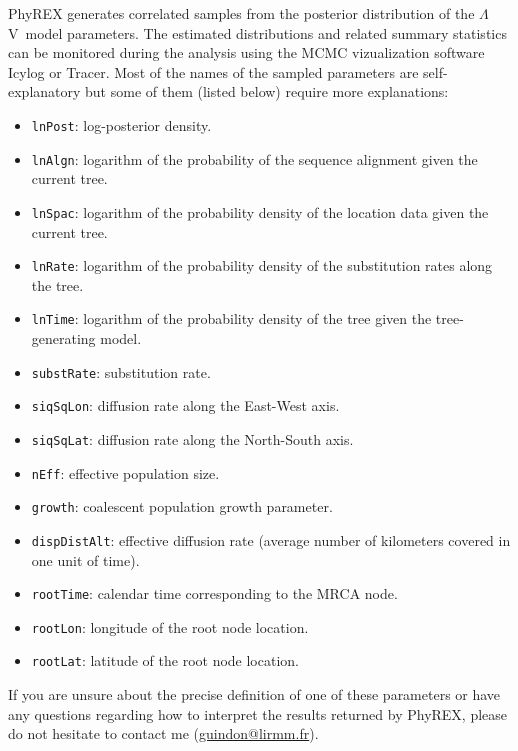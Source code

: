 \documentclass[a4paper,12pt]{article}
\newcommand{\sfv}{$\Lambda$V}
\begin{document}
PhyREX generates correlated samples from the posterior distribution of the \sfv\ model
parameters. The estimated distributions and related summary statistics can be monitored during the
analysis using the MCMC vizualization software Icylog or Tracer. Most of the names of the sampled
parameters are self-explanatory but some of them (listed below) require more explanations:
\begin{itemize}
\item \texttt{lnPost}: log-posterior density.
\item \texttt{lnAlgn}: logarithm of the probability of the sequence alignment given the current tree.
\item \texttt{lnSpac}: logarithm of the probability density of the location data given the current tree. 
\item \texttt{lnRate}: logarithm of the probability density of the substitution rates along the tree. 
\item \texttt{lnTime}: logarithm of the probability density of the tree given the tree-generating model. 
\item \texttt{substRate}: substitution rate.
\item \texttt{siqSqLon}: diffusion rate along the East-West axis.
\item \texttt{siqSqLat}: diffusion rate along the North-South axis.
\item \texttt{nEff}: effective population size.
\item \texttt{growth}: coalescent population growth parameter.
\item \texttt{dispDistAlt}: effective diffusion rate (average number of kilometers covered in one unit
  of time). 
\item \texttt{rootTime}: calendar time corresponding to the MRCA node. 

\item \texttt{rootLon}: longitude of the root node location.
\item \texttt{rootLat}: latitude of the root node location.
\end{itemize}
If you
are unsure about the precise definition of one of these parameters or have any questions regarding
how to interpret the results returned by PhyREX, please do not hesitate to contact me (\url{guindon@lirmm.fr}).

\end{document}
